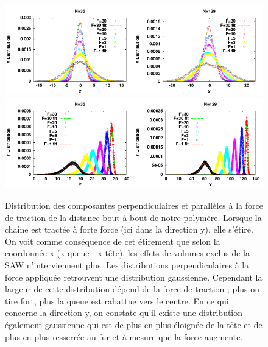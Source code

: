 \begin{figure}[H]
\begin{center}
\includegraphics[width=0.5\textwidth]{xdistribution35.pdf}\includegraphics[width=0.5\textwidth]{xdistribution129.pdf}\\
\includegraphics[width=0.5\textwidth]{ydistribution35.pdf}\includegraphics[width=0.5\textwidth]{ydistribution129.pdf}

\caption[Résultats numériques: distribution pendant la traction]{Distribution des composantes perpendiculaires et parallèles à la force de traction de la distance bout-à-bout de notre polymère. Lorsque la chaîne est tractée à forte force (ici dans la direction y), elle s'étire. On voit comme conséquence de cet étirement que selon la coordonnée x (x queue - x tête),  les effets de volumes exclus de la SAW n'interviennent plus. Les distributions perpendiculaires à la force appliquée retrouvent une distribution gaussienne. Cependant la largeur de cette distribution dépend de la force de traction ; plus on tire fort, plus la queue est rabattue vers le centre. En ce qui concerne la direction y, on constate qu'il existe une distribution également gaussienne qui est de plus en plus éloignée de la tête et de plus en plus resserrée au fur et à mesure que la force augmente. }
\label{traction}
\end{center}
\end{figure}

